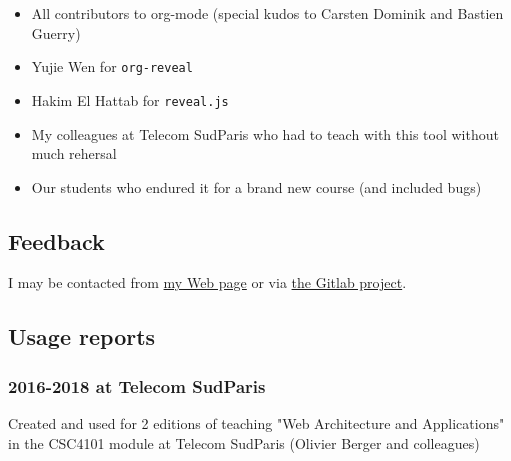 \documentclass[a4paper]{article}
\begin{document}
\begin{itemize}
\item All contributors to org-mode (special kudos to Carsten Dominik and Bastien Guerry)
\item Yujie Wen for \texttt{org-reveal}
\item Hakim El Hattab for \texttt{reveal.js}
\item My colleagues at Telecom SudParis who had to teach with this tool without much rehersal
\item Our students who endured it for a brand new course (and included bugs)
\end{itemize}

\subsection{Feedback}
\label{sec:orge9e9dca}

I may be contacted from \href{http://www-public.tem-tsp.eu/\~berger\_o/\#sec-3}{my Web page} or via \href{https://gitlab.com/olberger/org-teaching}{the Gitlab project}.

\subsection{Usage reports}
\label{sec:org319ef4c}

\subsubsection{2016-2018 at Telecom SudParis}
\label{sec:orgd7a55a0}

Created and used for 2 editions of teaching "Web Architecture and Applications" in the CSC4101 module at Telecom SudParis (Olivier Berger and colleagues)
\end{document}
